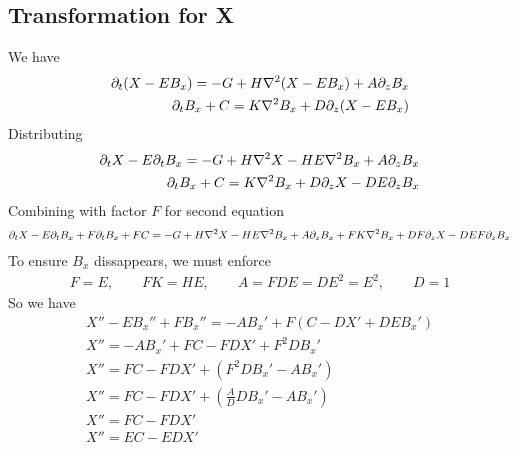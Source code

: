 \documentclass[11pt]{article}
\begin{document}
\subsection{Transformation for X}
We have
\begin{equation}\begin{aligned}
\partial_t (X - E B_x)        = -G+ H \nabla^2 (X - E B_x) + A \partial_z B_x \\
\partial_t B_x + C = K \nabla^2 B_x + D \partial_z (X - E B_x) \\
\end{aligned} \end{equation}
Distributing
\begin{equation}\begin{aligned}
\partial_t X - E \partial_t B_x = -G+ H \nabla^2 X - H E \nabla^2 B_x + A \partial_z B_x \\
\partial_t B_x + C = K \nabla^2 B_x + D \partial_z X - D E \partial_z B_x \\
\end{aligned} \end{equation}
Combining with factor $F$ for second equation
\begin{equation}\begin{aligned}
\partial_t X - E \partial_t B_x + F \partial_t B_x + FC = -G+ H \nabla^2 X - H E \nabla^2 B_x + A \partial_z B_x + F K \nabla^2 B_x + DF \partial_z X - D EF \partial_z B_x\\
\end{aligned} \end{equation}
To ensure $B_x$ dissappears, we must enforce
\begin{equation}\begin{aligned}
F = E, \qquad
FK = HE, \qquad
A = FDE = DE^2 = E^2, \qquad
D = 1
\end{aligned} \end{equation}
So we have
\begin{equation}\begin{aligned}
X'' - E B_x'' + FB_x''   = - A B_x' + F(C - D X' + D E B_x') \\
X'' = - A B_x' + FC - FD X' + F^2 D B_x' \\
X'' = FC - FD X' + (F^2 D B_x' - A B_x') \\
X'' = FC - FD X' + \left(\frac{A}{D} D B_x' - A B_x' \right) \\
X'' = FC - FD X' \\
X'' = EC - ED X' \\
\end{aligned} \end{equation}
\end{document}
